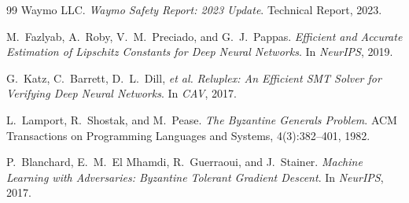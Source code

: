 \documentclass[11pt,twocolumn]{article}
\theoremstyle{definition}
\begin{document}
\begin{thebibliography}{99}
Waymo LLC.
\emph{Waymo Safety Report: 2023 Update}.
Technical Report, 2023.

M.~Fazlyab, A.~Roby, V.~M.~Preciado, and G.~J.~Pappas.
\emph{Efficient and Accurate Estimation of Lipschitz Constants for Deep
Neural Networks}.
In \emph{NeurIPS}, 2019.

G.~Katz, C.~Barrett, D.~L.~Dill, \emph{et al.}
\emph{Reluplex: An Efficient SMT Solver for Verifying Deep Neural Networks}.
In \emph{CAV}, 2017.

L.~Lamport, R.~Shostak, and M.~Pease.
\emph{The Byzantine Generals Problem}.
ACM Transactions on Programming Languages and Systems, 4(3):382--401, 1982.

P.~Blanchard, E.~M.~El Mhamdi, R.~Guerraoui, and J.~Stainer.
\emph{Machine Learning with Adversaries: Byzantine Tolerant Gradient
Descent}.
In \emph{NeurIPS}, 2017.

\end{thebibliography}
\end{document}
